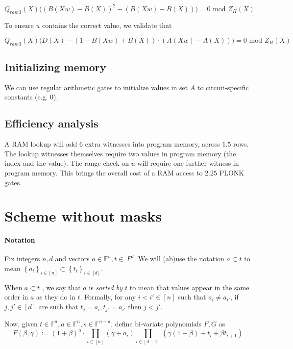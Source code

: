 \documentclass[11pt]{article} %
\newcommand{\F}{\ensuremath{\mathbb F}\xspace}
\newcommand{\defeq}{:=}
\newcommand{\sett}[2]{\ensuremath{\set{#1}_{#2}}\xspace}
\newcommand{\set}[1]{\ensuremath{\left\{#1\right\}}\xspace}
\begin{document}
$$
Q_{ram3}(X)\bigg((B(Xw) - B(X))^2 - (B(Xw) - B(X)) \bigg) = 0 \text{ mod } Z_H(X)
$$

To ensure $u$ contains the correct value, we validate that


$$
Q_{ram3}(X)\bigg(D(X) - (1 - B(Xw) + B(X)) \cdot (A(Xw) - A(X))\bigg) = 0 \text{ mod } Z_H(X)
$$
\subsection{Initializing memory}

We can use regular arithmetic gates to initialize values in set $A$ to circuit-specific constants (e.g. $0$).

\subsection{Efficiency analysis}

A RAM lookup will add $6$ extra witnesses into program memory, across $1.5$ rows. The lookup witnesses themselves require two values in program memory (the index and the value). The range check on $u$ will require one further witness in program memory. This brings the overall cost of a RAM access to $2.25$ PLONK gates.

\section{Scheme without masks}


\paragraph{Notation}

Fix integers $n,d$ and vectors $a\in \F^n, t\in\ F^d$.
We will (ab)use the notation $a\subset t$ to mean $\sett{a_i}{i\in [n]}\subset \sett{t_i}{i\in [d]}$.

When $a\subset t$ , we say that $a$ is \emph{sorted by $t$} to mean that values appear in the same order in $a$ as they do in $t$. Formally, for any $i<i'\in [n]$ such that $a_i\neq a_{i'}$, if $j,j'\in [d]$ are such that $t_{j} = a_i, t_{j'} =a_{i'}$ then $j<j'$.

Now, given $t\in \F^d, a\in \F^n, s\in \F^{n+d}$, define bi-variate polynomials $F,G$ as 
\[F(\beta,\gamma) \defeq (1+\beta)^n\cdot \prod_{i\in [n]} (\gamma + a_i) \prod_{i\in [d-1]} (\gamma(1+\beta) + t_i + \beta t_{i+1})\]
                                  
\end{document}
